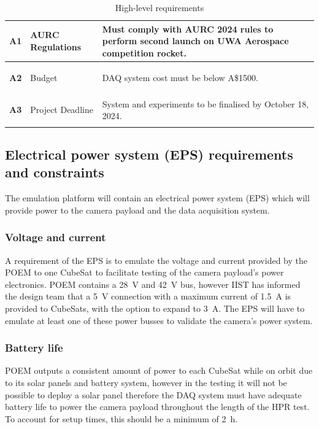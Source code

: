 \documentclass[draft]{report}
\newcommand{\aud}{A\$}
\begin{document}
\begin{table}[h!]
\begin{tabular}{|l|L{0.25\textwidth}|L{0.6\textwidth}|}
    \hypertarget{req-A1}{\textbf{A1}} & AURC Regulations               & Must comply with AURC 2024 rules to perform second launch on UWA Aerospace competition rocket.              \\ \hline
    \hypertarget{req-A2}{\textbf{A2}} & Budget                         & DAQ system cost must be below \aud 1500.                                                                    \\ \hline
    \hypertarget{req-A3}{\textbf{A3}} & Project Deadline               & System and experiments to be finalised by October 18, 2024.                                                 \\ \hline
  \end{tabular}
  \caption{High-level requirements}
  \label{tabl:high-level-requirements}
\end{table}


\subsection{Electrical power system (EPS) requirements and constraints}
The emulation platform will contain an electrical power system (EPS) which will provide power to the camera payload and the data acquisition system.

\subsubsection{Voltage and current}
A requirement of the EPS is to emulate the voltage and current provided by the POEM to one CubeSat to facilitate testing of the camera payload's power electronics. POEM contains a \SI{28}{\volt} and \SI{42}{\volt} bus, however IIST has informed the design team that a \SI{5}{\volt} connection with a maximum current of \SI{1.5}{\ampere} is provided to CubeSats, with the option to expand to \SI{3}{\ampere}. The EPS will have to emulate at least one of these power busses to validate the camera's power system.

\subsubsection{Battery life}
POEM outputs a consistent amount of power to each CubeSat while on orbit due to its solar panels and battery system, however in the testing it will not be possible to deploy a solar panel therefore the DAQ system must have adequate battery life to power the camera payload throughout the length of the HPR test. To account for setup times, this should be a minimum of \SI{2}{\hour}.
\end{document}
